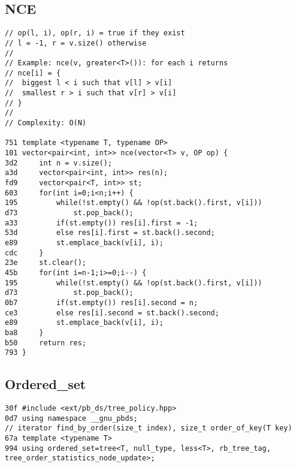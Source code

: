 \documentclass[11pt, a4paper, twoside]{article}
\begin{document}
\subsection{NCE}
\begin{lstlisting}
// op(l, i), op(r, i) = true if they exist
// l = -1, r = v.size() otherwise
//
// Example: nce(v, greater<T>()): for each i returns
// nce[i] = {
//  biggest l < i such that v[l] > v[i]
//  smallest r > i such that v[r] > v[i]
// }
//
// Complexity: O(N)

751 template <typename T, typename OP>
101 vector<pair<int, int>> nce(vector<T> v, OP op) {
3d2 	int n = v.size();
a3d 	vector<pair<int, int>> res(n);
fd9 	vector<pair<T, int>> st;
603 	for(int i=0;i<n;i++) {
195 		while(!st.empty() && !op(st.back().first, v[i])) 
d73 			st.pop_back();
a33 		if(st.empty()) res[i].first = -1;
53d 		else res[i].first = st.back().second;
e89 		st.emplace_back(v[i], i);
cdc 	}
23e 	st.clear();
45b 	for(int i=n-1;i>=0;i--) {
195 		while(!st.empty() && !op(st.back().first, v[i])) 
d73 			st.pop_back();
0b7 		if(st.empty()) res[i].second = n;
ce3 		else res[i].second = st.back().second;
e89 		st.emplace_back(v[i], i);
ba8 	}
b50 	return res;
793 }
\end{lstlisting}

\subsection{Ordered_set}
\begin{lstlisting}
30f #include <ext/pb_ds/tree_policy.hpp>
0d7 using namespace __gnu_pbds;
// iterator find_by_order(size_t index), size_t order_of_key(T key)
67a template <typename T> 
994 using ordered_set=tree<T, null_type, less<T>, rb_tree_tag, tree_order_statistics_node_update>;
\end{lstlisting}
\end{document}
